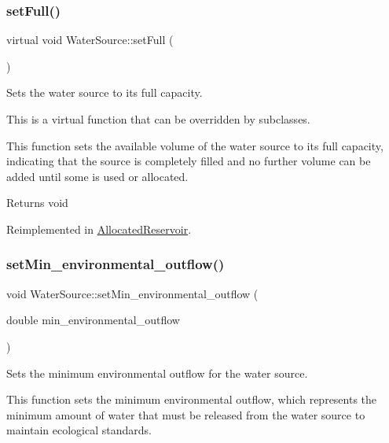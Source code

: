 \subsubsection{\texorpdfstring{set\+Full()}{setFull()}}
{\footnotesize\ttfamily virtual void Water\+Source\+::set\+Full (\begin{DoxyParamCaption}{ }\end{DoxyParamCaption})\hspace{0.3cm}{\ttfamily [virtual]}}



Sets the water source to its full capacity. 

This is a virtual function that can be overridden by subclasses.

This function sets the available volume of the water source to its full capacity, indicating that the source is completely filled and no further volume can be added until some is used or allocated.

\begin{DoxyReturn}{Returns}
void 
\end{DoxyReturn}


Reimplemented in \mbox{\hyperlink{classAllocatedReservoir_aea294cbca1e1630a1307072632d14b05}{Allocated\+Reservoir}}.

\mbox{\label{classWaterSource_a406246432d29f49189d53207ab1d895a}} 
\subsubsection{\texorpdfstring{set\+Min\+\_\+environmental\+\_\+outflow()}{setMin\_environmental\_outflow()}}
{\footnotesize\ttfamily void Water\+Source\+::set\+Min\+\_\+environmental\+\_\+outflow (\begin{DoxyParamCaption}\item[{double}]{min\+\_\+environmental\+\_\+outflow }\end{DoxyParamCaption})}



Sets the minimum environmental outflow for the water source. 

This function sets the minimum environmental outflow, which represents the minimum amount of water that must be released from the water source to maintain ecological standards.


